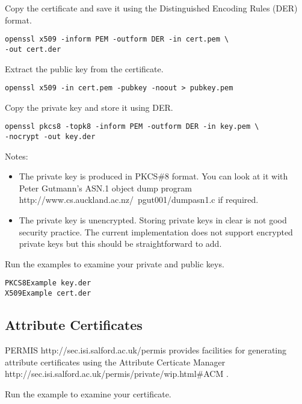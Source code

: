 \documentclass{article}
\begin{document}
Copy the certificate and save it
using the
Distinguished Encoding Rules (DER) format.

\begin{lstlisting}[frame=single]
openssl x509 -inform PEM -outform DER -in cert.pem \
-out cert.der
\end{lstlisting}

Extract the public key from the certificate.

\begin{lstlisting}[frame=single]
openssl x509 -in cert.pem -pubkey -noout > pubkey.pem
\end{lstlisting}

Copy the private key and store it using DER.

\begin{lstlisting}[frame=single]
openssl pkcs8 -topk8 -inform PEM -outform DER -in key.pem \
-nocrypt -out key.der
\end{lstlisting}

Notes:
\begin{itemize}
\item
The private key is produced in PKCS\#8 format.
You can look at it with Peter Gutmann's ASN.1 
\htmladdnormallinkfoot
{object dump program}
{http://www.cs.auckland.ac.nz/~pgut001/dumpasn1.c}
if required. 
\item
The private key is unencrypted. Storing private keys in clear 
is not good security practice. The current implementation does not support 
encrypted private keys but this should be straightforward to add.
\end{itemize}

Run the examples to examine your private and public keys.

\begin{lstlisting}[frame=single]
PKCS8Example key.der
X509Example cert.der
\end{lstlisting}

\subsection{Attribute Certificates}

\htmladdnormallinkfoot
{PERMIS}
{http://sec.isi.salford.ac.uk/permis}
provides facilities for generating attribute certificates using
the
\htmladdnormallinkfoot
{Attribute Certicate Manager}
{http://sec.isi.salford.ac.uk/permis/private/wip.html\#ACM}
.

Run the example to examine your certificate.
\end{document}
